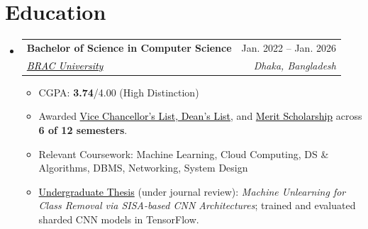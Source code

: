 \documentclass[a4paper]{article}
\makeatletter
\newcommand{\resumeItem}[1]{
  \item\small{
    {#1 \vspace{-2pt}}
  }
}
\newcommand{\resumeSubheading}[4]{
  \vspace{-2pt}\item
    \begin{tabular*}{0.97\textwidth}[t]{l@{\extracolsep{\fill}}r}
      \textbf{#1} & #2 \\
      \textit{\small#3} & \textit{\small #4} \\
    \end{tabular*}\vspace{-7pt}
}
\newcommand{\resumeSubHeadingListStart}{\begin{itemize}[leftmargin=0.15in, label={}]}
\newcommand{\resumeSubHeadingListEnd}{\end{itemize}}
\newcommand{\resumeItemListStart}{\begin{itemize}}
\newcommand{\resumeItemListEnd}{\end{itemize}\vspace{-5pt}}
\makeatother
\begin{document}
\section{Education}
  \resumeSubHeadingListStart
    \resumeSubheading
      {\textbf{Bachelor of Science in Computer Science}}{Jan. 2022 -- Jan. 2026}
{\href{https://www.bracu.ac.bd/}{\textcolor{black}{BRAC University}}}{Dhaka, Bangladesh}
      \resumeItemListStart
        \resumeItem{CGPA: \textbf{3.74}/4.00 (High Distinction)}
        \resumeItem{Awarded \href{https://www.bracu.ac.bd/academics/policies-and-procedures/academic-standings-and-honors}{\textcolor{black}{Vice Chancellor's List, Dean's List}}, and \href{https://www.bracu.ac.bd/admissions/international-applicants/scholarship-financial-aid}{\textcolor{black}{Merit Scholarship}} across \textbf{6 of 12 semesters}.}
        \resumeItem{Relevant Coursework: Machine Learning, Cloud Computing, DS \& Algorithms, DBMS, Networking, System Design}
        \resumeItem{\href{https://arxiv.org/abs/2604.27804}{\textcolor{black}{Undergraduate Thesis}} (under journal review): \textit{Machine Unlearning for Class Removal via SISA-based CNN Architectures}; trained and evaluated sharded CNN models in TensorFlow.}
      \resumeItemListEnd
  \resumeSubHeadingListEnd




\end{document}
